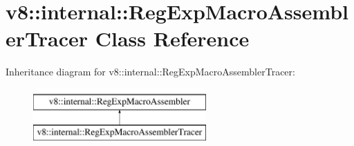 \hypertarget{classv8_1_1internal_1_1RegExpMacroAssemblerTracer}{}\section{v8\+:\+:internal\+:\+:Reg\+Exp\+Macro\+Assembler\+Tracer Class Reference}
\label{classv8_1_1internal_1_1RegExpMacroAssemblerTracer}
Inheritance diagram for v8\+:\+:internal\+:\+:Reg\+Exp\+Macro\+Assembler\+Tracer\+:\begin{figure}[H]
\begin{center}
\leavevmode
\includegraphics[height=2.000000cm]{classv8_1_1internal_1_1RegExpMacroAssemblerTracer}
\end{center}
\end{figure}
